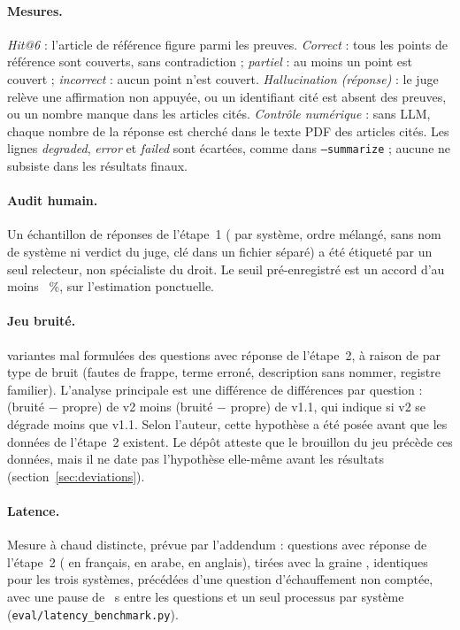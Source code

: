 \paragraph{Mesures.} \emph{Hit@6} : l'article de référence figure parmi les preuves. \emph{Correct} : tous les points de
référence sont couverts, sans contradiction ; \emph{partiel} : au moins un point est couvert ; \emph{incorrect} : aucun point
n'est couvert. \emph{Hallucination (réponse)} : le juge relève une affirmation non appuyée, ou un identifiant cité est absent
des preuves, ou un nombre manque dans les articles cités. \emph{Contrôle numérique} : sans LLM, chaque nombre de la réponse est
cherché dans le texte PDF des articles cités. Les lignes \emph{degraded}, \emph{error} et \emph{failed} sont écartées, comme dans
\texttt{--summarize} ; aucune ne subsiste dans les résultats finaux.

\paragraph{Audit humain.} Un échantillon de \EvAuditRows{} réponses de l'étape~1 (\EvAuditPerSystemVone{} par système, ordre
mélangé, sans nom de système ni verdict du juge, clé dans un fichier séparé) a été étiqueté par un seul relecteur, non
spécialiste du droit. Le seuil pré-enregistré est un accord d'au moins \EvPreAudit~\%, sur l'estimation ponctuelle.

\paragraph{Jeu bruité.} \EvNoisyN{} variantes mal formulées des \EvStwoAnswer{} questions avec réponse de l'étape~2, à raison de
\EvGroupTyposN{} par type de bruit (fautes de frappe, terme erroné, description sans nommer, registre familier). L'analyse
principale est une différence de différences par question : (bruité $-$ propre) de v2 moins (bruité $-$ propre) de v1.1, qui
indique si v2 se dégrade moins que v1.1. Selon l'auteur, cette hypothèse a été posée avant que les données de l'étape~2 existent.
Le dépôt atteste que le brouillon du jeu précède ces données, mais il ne date pas l'hypothèse elle-même avant les résultats
(section~\ref{sec:deviations}).

\paragraph{Latence.} Mesure à chaud distincte, prévue par l'addendum : \EvLatQuestions{} questions avec réponse de l'étape~2
(\EvLatFr{} en français, \EvLatAr{} en arabe, \EvLatEn{} en anglais), tirées avec la graine \EvSeed, identiques pour les trois
systèmes, précédées d'une question d'échauffement non comptée, avec une pause de \EvLatPause~s entre les questions et un
seul processus par système (\texttt{eval/latency\_benchmark.py}).

